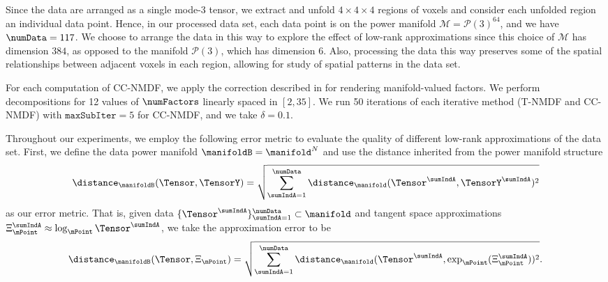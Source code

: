 Since the data are arranged as a single mode-3 tensor, we extract and unfold $4 \times 4 \times 4$ regions of voxels and consider each unfolded region an individual data point. Hence, in our processed data set, each data point is on the power manifold $\mathcal{M} = \mathcal{P}(3)^{64}$, and we have $\numData = 117$. We choose to arrange the data in this way to explore the effect of low-rank approximations since this choice of $\mathcal{M}$ has dimension $384$, as opposed to the manifold $\mathcal{P}(3)$, which has dimension $6$. Also, processing the data this way preserves some of the spatial relationships between adjacent voxels in each region, allowing for study of spatial patterns in the data set. 

For each computation of CC-NMDF, we apply the correction described in  for rendering manifold-valued factors. We perform decompositions for 12 values of $\numFactors$ linearly spaced in $[2,35]$. We run 50 iterations of each iterative method (T-NMDF and CC-NMDF) with $\texttt{maxSubIter} = 5$ for CC-NMDF, and we take $\delta = 0.1$.


Throughout our experiments, we employ the following error metric to evaluate the quality of different low-rank approximations of the data set. First, we define the data power manifold $\manifoldB = \manifold^{N}$ and use the distance inherited from the power manifold structure
\begin{equation}
    \distance_{\manifoldB}(\Tensor, \TensorY) = \sqrt{\sum_{\sumIndA=1}^\numData \distance_{\manifold}(\Tensor^\sumIndA, \TensorY^\sumIndA)^2}
\end{equation}
as our error metric. That is, given data $\{\Tensor^\sumIndA\}_{\sumIndA=1}^\numData \subset \manifold$ and tangent space approximations $\Xi_\mPoint^\sumIndA \approx \log_\mPoint \Tensor^\sumIndA$, we take the approximation error to be
\begin{equation}
    \distance_{\manifoldB} (\Tensor, \Xi_\mPoint) = \sqrt{\sum_{\sumIndA=1}^\numData \distance_{\manifold}(\Tensor^\sumIndA, \exp_{\mPoint}(\Xi_{\mPoint}^\sumIndA))^2}.
\end{equation}


